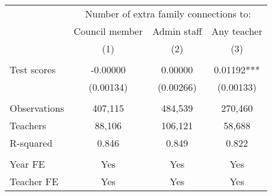 \setlength{\pdfpagewidth}{8.5in} \setlength{\pdfpageheight}{11in}

\begin{tabular}{lccc} \hline
 & \multicolumn{3}{c}{Number of extra family connections to:} \\
  & Council member & Admin staff & Any teacher \\
 & (1) & (2) & (3) \\
  \hline
  &  &  &  \\
Test scores & -0.00000 & 0.00000 & 0.01192*** \\
 & (0.00134) & (0.00266) & (0.00133) \\
 &  &  &  \\
Observations & 407,115 & 484,539 & 270,460 \\
Teachers & 88,106 & 106,121 & 58,688 \\
R-squared & 0.846 & 0.849 & 0.822 \\
 &  &  &  \\
Year FE & Yes & Yes & Yes \\
 Teacher FE & Yes & Yes & Yes \\ \hline
\end{tabular}

